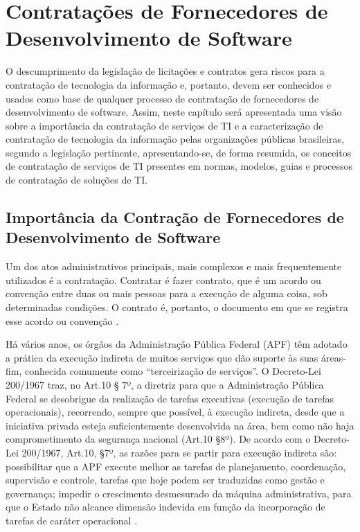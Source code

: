 
\chapter[Contratações de Fornecedores de Desenvolvimento de Software]{Contratações de Fornecedores de Desenvolvimento de Software}

O descumprimento da legislação de licitações e contratos gera riscos para a contratação de tecnologia da informação e, portanto, devem ser conhecidos e usados como base de qualquer processo de contratação de fornecedores de desenvolvimento de software. Assim, neste capítulo será apresentada uma visão sobre a importância da contratação de serviços de TI e a caracterização de contratação de tecnologia da informação pelas organizações públicas brasileiras, segundo a legislação pertinente, apresentando-se, de forma resumida, os conceitos de contratação de serviços de TI presentes em normas, modelos, guias e processos de contratação de soluções de TI.

\section[Importância da Contração de Fornecedores de Desenvolvimento de Software]{Importância da Contração de Fornecedores de Desenvolvimento de Software}

Um dos atos administrativos principais, mais complexos e mais frequentemente utilizados é a contratação. Contratar é fazer contrato, que é um acordo ou convenção entre duas ou mais pessoas para a execução de alguma coisa, sob determinadas condições. O contrato é, portanto, o documento em que se registra esse acordo ou convenção \cite{MPOG:2011}.

Há vários anos, os órgãos da Administração Pública Federal (APF) têm adotado a prática da execução indireta de muitos serviços que dão suporte às suas áreas-fim, conhecida comumente como “terceirização de serviços”. O Decreto-Lei 200/1967 traz, no Art.10 § 7º, a diretriz para que a Administração Pública Federal se desobrigue da realização de tarefas executivas (execução de tarefas operacionais), recorrendo, sempre que possível, à execução indireta, desde que a iniciativa privada esteja suficientemente desenvolvida na área, bem como não haja comprometimento da segurança nacional (Art.10 §8º). De acordo com o Decreto-Lei 200/1967, Art.10, §7º, as razões para se partir para execução indireta são: possibilitar que a APF execute melhor as tarefas de planejamento, coordenação, supervisão e controle, tarefas que hoje podem ser traduzidas como gestão e governança; impedir o crescimento desmesurado da máquina administrativa, para que o Estado não alcance dimensão indevida em função da incorporação de tarefas de caráter operacional  \cite{TCU:2012}. 

